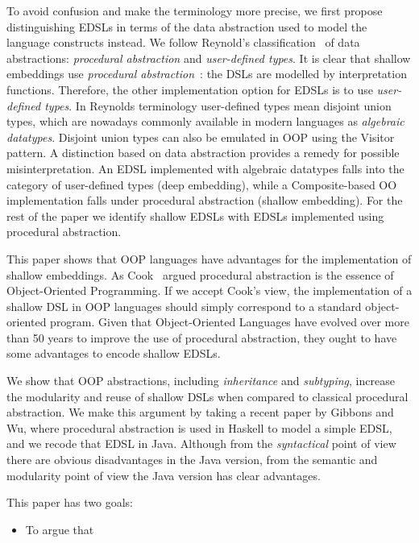 To avoid confusion and make the terminology more precise, we first 
propose distinguishing EDSLs in terms of the data
abstraction used to model the language constructs instead.  We follow
Reynold's classification~\cite{} of data abstractions:
\emph{procedural abstraction} and \emph{user-defined types}. It is
clear that shallow embeddings use \emph{procedural
  abstraction}~\cite{}: the DSLs are modelled by interpretation
functions. Therefore, the other implementation option for EDSLs is to use
\emph{user-defined types}. In Reynolds terminology user-defined types
mean disjoint union types, which are nowadays commonly available in
modern languages as \emph{algebraic datatypes}. Disjoint union types 
can also be emulated in OOP using the {\sc Visitor} pattern. A
distinction based on data abstraction provides a remedy for possible
misinterpretation. An EDSL implemented with algebraic
datatypes falls into the category of user-defined types (deep embedding), 
while a Composite-based OO implementation falls under procedural
abstraction (shallow embedding). For the rest of the paper we identify shallow EDSLs 
with EDSLs implemented using procedural abstraction.

This paper shows that OOP languages have
advantages for the implementation of shallow embeddings.
As Cook~\cite{} argued procedural abstraction is the essence of
Object-Oriented Programming. If we accept Cook's view, the
implementation of a shallow DSL in OOP languages should simply
correspond to a standard object-oriented program. Given
that Object-Oriented Languages have evolved over more than 50 years 
to improve the use of procedural abstraction, they ought to have some 
advantages to encode shallow EDSLs. 

We show that OOP abstractions, including \emph{inheritance}
and \emph{subtyping}, increase the modularity and reuse of shallow
DSLs when compared to classical procedural abstraction. We make this
argument by taking a recent paper by Gibbons and Wu, where procedural
abstraction is used in Haskell to model a simple EDSL, and we recode
that EDSL in Java. Although from the \emph{syntactical} point of view
there are obvious disadvantages in the Java version, from the semantic
and modularity point of view the Java version has clear advantages.


This paper has two goals:

\begin{itemize}

\item To argue that 

\end{itemize} 